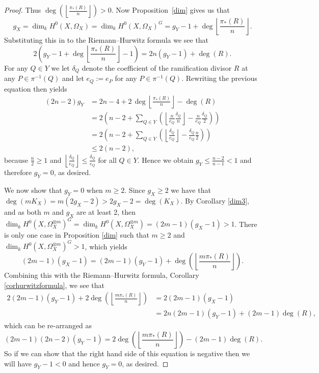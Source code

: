 \begin{proof}
    Thus $\deg\left( \left\lfloor \frac{\pi_*(R)}{n} \right\rfloor \right) >0$. 
    Now Proposition~\ref{dim} gives us that
        \begin{equation*}
        g_X=\dim_k H^0(X,\Omega_X)=\dim_k H^0(X,\Omega_X)^G= g_Y-1+\deg\left\lfloor \frac{\pi_*(R)}{n} \right\rfloor.
        \end{equation*}
    Substituting this in to the Riemann--Hurwitz formula we see that
        \begin{equation*}
        2\left(g_Y - 1 + \deg\left \lfloor \frac{\pi_*(R)}{n} \right \rfloor -1 \right) = 2n (g_Y -1) + \deg(R).
        \end{equation*}
    For any $Q \in Y$ we let $\delta_Q$ denote the coefficient of the ramification divisor $R$ at any $P \in \pi^{-1}(Q)$ and let $e_Q := e_P$ for any $P \in \pi^{-1}(Q)$. 
    Rewriting the previous equation then yields
        \begin{align*}
        (2n-2)g_Y & = 2n-4 + 2 \,\deg\left \lfloor \frac{\pi_*(R)}{n}\right \rfloor - \deg(R)\\
        &= 2 \left(n-2 + \sum_{Q \in Y} \left(\left\lfloor \frac{n}{e_Q} \frac{\delta_Q}{n} \right\rfloor - \frac{n}{e_Q} \frac{\delta_Q}{2}\right) \right)\\
        &= 2 \left(n-2 + \sum_{Q \in Y} \left( \left\lfloor \frac{\delta_Q}{e_Q} \right\rfloor - \frac{\delta_Q}{e_Q} \frac{n}{2} \right)\right)\\
        & \le  2(n-2),
        \end{align*}
    because $\frac{n}{2} \ge 1$ and $\left\lfloor \frac{\delta_Q}{e_Q}\right\rfloor \le \frac{\delta_Q}{e_Q}$ for all $Q \in Y$. 
    Hence we obtain $g_Y \le \frac{n-2}{n-1} < 1$ and therefore $g_Y =0$, as desired.
    
    We now show that $g_Y=0$ when $m\geq 2$. 
    Since $g_X\geq 2$ we have that $\deg(mK_X)=m(2g_X-2)>2g_X-2=\deg(K_X)$.
    By Corollary \ref{dim3}, and as both $m$ and $g_X$ are at least 2, then $\dim_kH^0(X,\Omega_X^{\otimes m})^G=\dim_kH^0(X,\Omega_X^{\otimes m})=(2m-1)(g_X-1)>1$.
    There is only one case in Proposition \ref{dim} such that $m\geq 2$ and $\dim_k H^0(X,\Omega_X^{\otimes m})^G>1$, which yields 
        \begin{equation*}
        (2m-1)(g_X-1)=(2m-1)(g_Y-1)+\deg\left(\left\lfloor \frac{m\pi_*(R)}{n} \right\rfloor \right).
        \end{equation*}
    Combining this with the Riemann--Hurwitz formula, Corollary \ref{corhurwitzformula}, we see that
        \begin{align*}
        2(2m-1)(g_Y-1)+2\deg\left(\left\lfloor\frac{m\pi_*(R)}{n}\right\rfloor\right) & =  2(2m-1)(g_X-1)\\
        & =  2n(2m-1)(g_Y-1)+(2m-1)\deg(R),
        \end{align*}
    which can be re-arranged as
        \begin{equation*}
        (2m-1)(2n-2)(g_Y-1)=2\deg\left(\left\lfloor\frac{m\pi_*(R)}{n}\right\rfloor\right)-(2m-1)\deg(R).
        \end{equation*}
    So if we can show that the right hand side of this equation is negative then we will have $g_Y-1<0$ and hence $g_Y=0$, as desired.
    

\end{proof}
